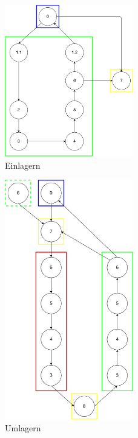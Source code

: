 %
\begin{figure}[h]
  \begin{center}
    \includegraphics[width=0.5\textwidth]{images/einlagern.png}
    \caption{Einlagern}
    \label{fig:in}
  \end{center}
\end{figure}
%
\begin{figure}[h]
  \begin{center}
    \includegraphics[width=0.5\textwidth]{images/umlagern.png}
    \caption{Umlagern}
    \label{fig:move}
  \end{center}
\end{figure}
%
